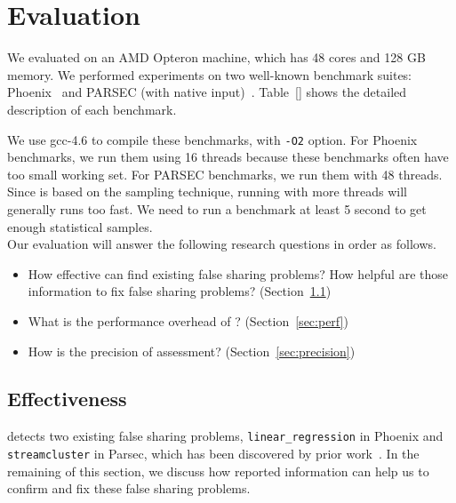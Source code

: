 \section{Evaluation}
\label{sec:eval}

We evaluated \cheetah{} on an AMD Opteron machine, which has 48 cores and 128 GB memory.   We performed experiments on two well-known benchmark suites: Phoenix~\cite{phoenix-hpca} and PARSEC (with native input)~\cite{parsec}. Table~\ref{} shows the detailed description of each benchmark. 

We use gcc-4.6 to compile these benchmarks, with {\tt -O2} option. For Phoenix benchmarks, we run them using 16 threads because these benchmarks often have too small working set. For PARSEC benchmarks, we run them with 48 threads. Since \cheetah{} is based on the sampling technique, running with more threads will generally runs too fast. We need to run a benchmark at least 5 second to get enough statistical samples. \\

\sloppy{}
Our evaluation will answer the following research questions in order as follows. 

\begin{itemize}
\item How effective can \cheetah{} find existing false sharing problems? How helpful are those information to fix false sharing problems?  (Section~\ref{sec:effectiveness})

\item What is the performance overhead of \cheetah{}? (Section~\ref{sec:perf})

\item How is the precision of assessment?  (Section~\ref{sec:precision})

\end{itemize}

\subsection{Effectiveness}
\label{sec:effectiveness}

\cheetah{} detects two existing false sharing problems, \texttt{linear\_regression} in Phoenix and \texttt{streamcluster} in Parsec, which has been discovered by prior work~\cite{Sheriff, Predator}. In the remaining of this section, we discuss how reported information can help us to confirm and fix these false sharing problems. 

